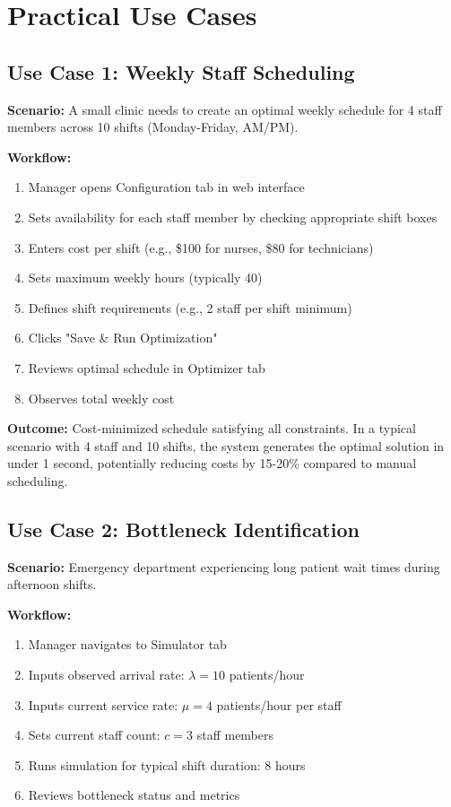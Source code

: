 \documentclass[12pt,a4paper]{article}
\begin{document}
\newpage

\section{Practical Use Cases}
\label{sec:usecases}

\subsection{Use Case 1: Weekly Staff Scheduling}
\label{subsec:usecase1}

\textbf{Scenario:} A small clinic needs to create an optimal weekly schedule for 4 staff members across 10 shifts (Monday-Friday, AM/PM).

\textbf{Workflow:}
\begin{enumerate}
    \item Manager opens Configuration tab in web interface
    \item Sets availability for each staff member by checking appropriate shift boxes
    \item Enters cost per shift (e.g., \$100 for nurses, \$80 for technicians)
    \item Sets maximum weekly hours (typically 40)
    \item Defines shift requirements (e.g., 2 staff per shift minimum)
    \item Clicks "Save \& Run Optimization"
    \item Reviews optimal schedule in Optimizer tab
    \item Observes total weekly cost
\end{enumerate}

\textbf{Outcome:} Cost-minimized schedule satisfying all constraints. In a typical scenario with 4 staff and 10 shifts, the system generates the optimal solution in under 1 second, potentially reducing costs by 15-20\% compared to manual scheduling.

\subsection{Use Case 2: Bottleneck Identification}
\label{subsec:usecase2}

\textbf{Scenario:} Emergency department experiencing long patient wait times during afternoon shifts.

\textbf{Workflow:}
\begin{enumerate}
    \item Manager navigates to Simulator tab
    \item Inputs observed arrival rate: $\lambda = 10$ patients/hour
    \item Inputs current service rate: $\mu = 4$ patients/hour per staff
    \item Sets current staff count: $c = 3$ staff members
    \item Runs simulation for typical shift duration: 8 hours
    \item Reviews bottleneck status and metrics
\end{enumerate}
\end{document}
